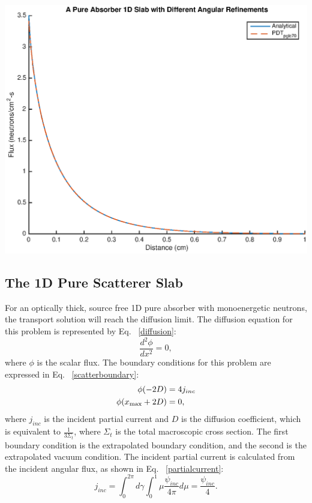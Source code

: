 \noindent\begin{minipage}{\textwidth}
\centering
\includegraphics[scale = 0.8]{figures/PureAbsorberBestangle.eps}
\label{pa_bestangle}
\end{minipage}
\smallskip

\subsection{The 1D Pure Scatterer Slab}

For an optically thick, source free 1D pure absorber with monoenergetic neutrons, the transport solution will reach the diffusion limit. The diffusion equation for this problem is represented by Eq. ~\eqref{diffusion}:
\begin{equation}
\frac{d^2\phi}{dx^2} = 0,
\label{diffusion}
\end{equation}
where $\phi$ is the scalar flux. The boundary conditions for this problem are expressed in Eq. ~\eqref{scatterboundary}:
\begin{align}
\phi(-2D) &= 4j_{inc} \notag \\
\phi(x_{\text{max}}+2D) &= 0, 
\label{scatterboundary}
\end{align}
where $j_{inc}$ is the incident partial current and $D$ is the diffusion coefficient, which is equivalent to $\frac{1}{3 \Sigma_t}$, where $\Sigma_t$ is the total macroscopic cross section. The first boundary condition is the extrapolated boundary condition, and the second is the extrapolated vacuum condition. The incident partial current is calculated from the incident angular flux, as shown in Eq. ~\eqref{partialcurrent}:
\begin{equation}
j_{inc} = \int_{0}^{2\pi}d\gamma \int_{0}^{1} \mu \frac{\psi_{inc}}{4\pi} d\mu = \frac{\psi_{inc}}{4}.
\label{partialcurrent}
\end{equation}

